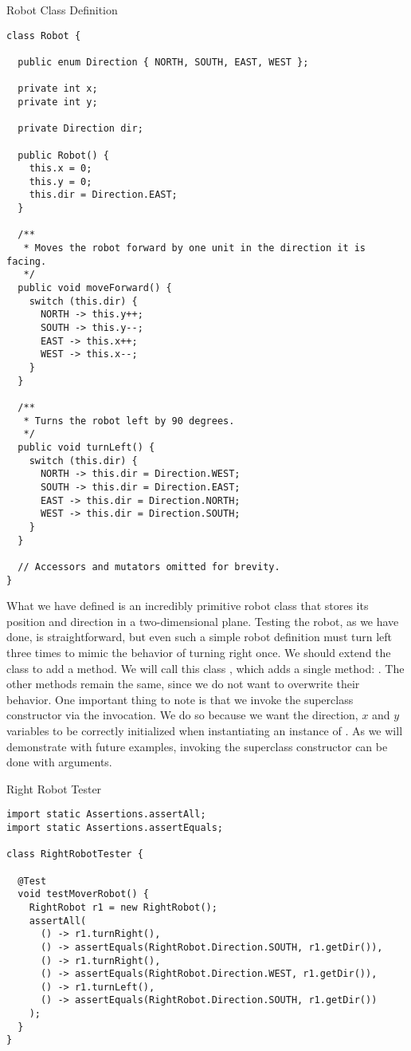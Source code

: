 \begin{cl}{Robot Class Definition}
\begin{lstlisting}[language=MyJava]
class Robot {

  public enum Direction { NORTH, SOUTH, EAST, WEST };

  private int x;
  private int y;

  private Direction dir;

  public Robot() {
    this.x = 0;
    this.y = 0;
    this.dir = Direction.EAST;
  }

  /**
   * Moves the robot forward by one unit in the direction it is facing.
   */
  public void moveForward() {
    switch (this.dir) {
      NORTH -> this.y++;
      SOUTH -> this.y--;
      EAST -> this.x++;
      WEST -> this.x--;
    }
  }

  /**
   * Turns the robot left by 90 degrees.
   */
  public void turnLeft() {
    switch (this.dir) {
      NORTH -> this.dir = Direction.WEST;
      SOUTH -> this.dir = Direction.EAST;
      EAST -> this.dir = Direction.NORTH;
      WEST -> this.dir = Direction.SOUTH;
    }
  }

  // Accessors and mutators omitted for brevity.
}
\end{lstlisting}
\end{cl}

What we have defined is an incredibly primitive robot class that stores its position and direction in a two-dimensional plane. Testing the robot, as we have done, is straightforward, but even such a simple robot definition must turn left three times to mimic the behavior of turning right once. We should extend the  class to add a  method. We will call this class , which adds a single method: . The other methods remain the same, since we do not want to overwrite their behavior. One important thing to note is that we invoke the superclass constructor via the  invocation. We do so because we want the direction, $x$ and $y$ variables to be correctly initialized when instantiating an instance of . As we will demonstrate with future examples, invoking the superclass constructor can be done with arguments.

\begin{cl}{Right Robot Tester}
\begin{lstlisting}[language=MyJava]
import static Assertions.assertAll;
import static Assertions.assertEquals;

class RightRobotTester {

  @Test
  void testMoverRobot() {
    RightRobot r1 = new RightRobot();
    assertAll(
      () -> r1.turnRight(),
      () -> assertEquals(RightRobot.Direction.SOUTH, r1.getDir()),
      () -> r1.turnRight(),
      () -> assertEquals(RightRobot.Direction.WEST, r1.getDir()),
      () -> r1.turnLeft(),
      () -> assertEquals(RightRobot.Direction.SOUTH, r1.getDir())
    );
  }
}
\end{lstlisting}
\end{cl}


